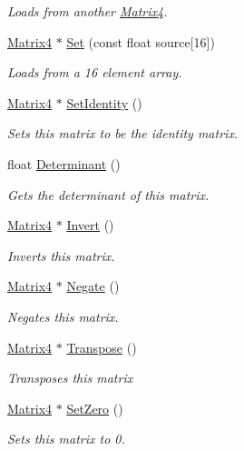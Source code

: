 \begin{DoxyCompactItemize}
\begin{DoxyCompactList}\small\item\em Loads from another \hyperlink{class_flounder_1_1_matrix4}{Matrix4}. \end{DoxyCompactList}\item 
\hyperlink{class_flounder_1_1_matrix4}{Matrix4} $\ast$ \hyperlink{class_flounder_1_1_matrix4_ab7d73c241a8ac4dd7f1a88b379190393}{Set} (const float source\mbox{[}16\mbox{]})
\begin{DoxyCompactList}\small\item\em Loads from a 16 element array. \end{DoxyCompactList}\item 
\hyperlink{class_flounder_1_1_matrix4}{Matrix4} $\ast$ \hyperlink{class_flounder_1_1_matrix4_a7a8cd8a631fc2254d2936280098eee37}{Set\+Identity} ()
\begin{DoxyCompactList}\small\item\em Sets this matrix to be the identity matrix. \end{DoxyCompactList}\item 
float \hyperlink{class_flounder_1_1_matrix4_aadbcf417560d24ffdc76fb3b9f0da3d8}{Determinant} ()
\begin{DoxyCompactList}\small\item\em Gets the determinant of this matrix. \end{DoxyCompactList}\item 
\hyperlink{class_flounder_1_1_matrix4}{Matrix4} $\ast$ \hyperlink{class_flounder_1_1_matrix4_a1661b4414ca902c626bd9e7dc0c08a92}{Invert} ()
\begin{DoxyCompactList}\small\item\em Inverts this matrix. \end{DoxyCompactList}\item 
\hyperlink{class_flounder_1_1_matrix4}{Matrix4} $\ast$ \hyperlink{class_flounder_1_1_matrix4_ac6cc46cd2070c9d224f092dba27a8828}{Negate} ()
\begin{DoxyCompactList}\small\item\em Negates this matrix. \end{DoxyCompactList}\item 
\hyperlink{class_flounder_1_1_matrix4}{Matrix4} $\ast$ \hyperlink{class_flounder_1_1_matrix4_aefe1d209cfb6015f227524ee11a862a2}{Transpose} ()
\begin{DoxyCompactList}\small\item\em Transposes this matrix \end{DoxyCompactList}\item 
\hyperlink{class_flounder_1_1_matrix4}{Matrix4} $\ast$ \hyperlink{class_flounder_1_1_matrix4_aad9bda4702a5c43914377e9156cbecdb}{Set\+Zero} ()
\begin{DoxyCompactList}\small\item\em Sets this matrix to 0. \end{DoxyCompactList}\end{DoxyCompactItemize}
